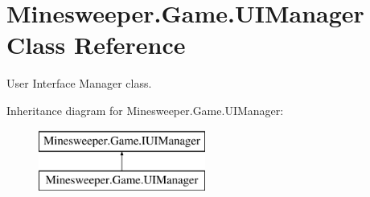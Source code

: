 \hypertarget{class_minesweeper_1_1_game_1_1_u_i_manager}{\section{Minesweeper.\+Game.\+U\+I\+Manager Class Reference}
\label{class_minesweeper_1_1_game_1_1_u_i_manager}
}


User Interface Manager class.  


Inheritance diagram for Minesweeper.\+Game.\+U\+I\+Manager\+:\begin{figure}[H]
\begin{center}
\leavevmode
\includegraphics[height=2.000000cm]{class_minesweeper_1_1_game_1_1_u_i_manager}
\end{center}
\end{figure}
